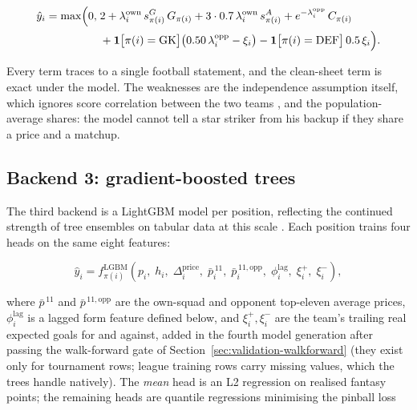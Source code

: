 \begin{align}
\hat{y}_i = \max\Bigl(0,\;
  & 2
  + \lambda^{\mathrm{own}}_i\, s^{G}_{\pi(i)}\, G_{\pi(i)}
  + 3 \cdot 0.7\, \lambda^{\mathrm{own}}_i\, s^{A}_{\pi(i)}
  + e^{-\lambda^{\mathrm{opp}}_i}\, C_{\pi(i)} \nonumber\\
  & + \mathbf{1}\bigl[\pi(i) = \mathrm{GK}\bigr]
      \bigl(0.50\, \lambda^{\mathrm{opp}}_i - \xi_i\bigr)
    - \mathbf{1}\bigl[\pi(i) = \mathrm{DEF}\bigr]\, 0.5\, \xi_i
  \Bigr).
\label{eq:poisson-total}
\end{align}

Every term traces to a single football statement, and the clean-sheet
term is exact under the model. The weaknesses are the independence
assumption itself, which ignores score correlation between the two
teams \citep{karlis2003analysis}, and the population-average shares:
the model cannot tell a star striker from his backup if they share a
price and a matchup.

\subsection{Backend 3: gradient-boosted trees}
\label{sec:methodology-gbm}

The third backend is a LightGBM model \citep{ke2017lightgbm} per
position, reflecting the continued strength of tree ensembles on
tabular data at this scale \citep{shwartz2022tabular,
borisov2022deeptabular}. Each position trains four heads on the same
eight features:

\begin{equation}
\hat{y}_i = f^{\mathrm{LGBM}}_{\pi(i)}\!\left(
  p_i,\; h_i,\; \Delta^{\mathrm{price}}_i,\;
  \bar{p}^{\,11}_i,\; \bar{p}^{\,11,\mathrm{opp}}_i,\;
  \phi^{\mathrm{lag}}_i,\; \xi^{+}_i,\; \xi^{-}_i
\right),
\label{eq:gbm}
\end{equation}

where $\bar{p}^{\,11}$ and $\bar{p}^{\,11,\mathrm{opp}}$ are the
own-squad and opponent top-eleven average prices,
$\phi^{\mathrm{lag}}_i$ is a lagged form feature defined below, and
$\xi^{+}_i, \xi^{-}_i$ are the team's trailing real expected goals
for and against, added in the fourth model generation after passing
the walk-forward gate of Section~\ref{sec:validation-walkforward}
(they exist only for tournament rows; league training rows carry
missing values, which the trees handle natively). The
\emph{mean} head is an L2 regression on realised fantasy points; the
remaining heads are quantile regressions minimising the pinball loss

